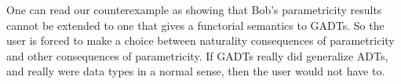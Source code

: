 \documentclass[acmsmall,screen,review,anonymous]{acmart}
\theoremstyle{definition}
\begin{document}
One can read our counterexample as showing that Bob's parametricity
results cannot be extended to one that gives a functorial semantics to
GADTs. So the user is forced to make a choice between naturality
consequences of parametricity and other consequences of
parametricity. If GADTs really did generalize ADTs, and really were
data types in a normal sense, then the user would not have to.








\end{document}
